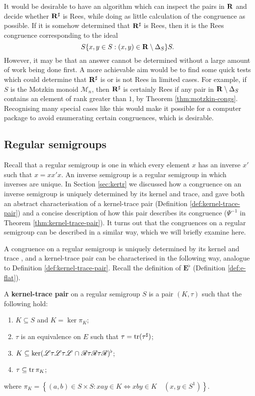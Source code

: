 It would be desirable to have an algorithm which can inspect the pairs in $\mathbf{R}$
and decide whether $\mathbf{R}^\sharp$ is Rees, while doing as little calculation of the
congruence as possible.  If it is somehow determined that $\mathbf{R}^\sharp$ is Rees, then it
is the Rees congruence corresponding to the ideal
$$S\{x,y \in S : (x,y) \in \mathbf{R} \setminus \Delta_S\}S.$$
However, it may be that an answer cannot be determined without a large amount of
work being done first.  A more achievable aim would be to find some quick tests
which could determine that $\mathbf{R}^\sharp$ is or is not Rees in limited cases.  For
example, if $S$ is the Motzkin monoid $\mathcal{M}_n$, then $\mathbf{R}^\sharp$ is certainly
Rees if any pair in $\mathbf{R} \setminus \Delta_S$ contains an element of rank greater
than $1$, by Theorem \ref{thm:motzkin-congs}.  Recognising many special cases
like this would make it possible for a computer package to avoid enumerating
certain congruences, which is desirable.

\subsection{Regular semigroups}
\label{sec:converting-regular}
Recall that a regular semigroup  is one in which every element $x$ has an inverse
$x'$ such that $x = xx'x$.  An inverse semigroup is a regular semigroup in which
inverses are unique.  In Section \ref{sec:kertr} we discussed how a congruence
on an inverse semigroup is uniquely determined by its kernel and trace, and gave
both an abstract characterisation of a kernel-trace pair (Definition
\ref{def:kernel-trace-pair}) and a concise description of how this pair
describes its congruence ($\Psi^{-1}$ in Theorem \ref{thm:kernel-trace-pair}).
It turns out that the congruences on a regular semigroup can be described in a
similar way, which we will briefly examine here.

A congruence on a regular semigroup is uniquely determined by its kernel and
trace \cite[Corollary 2.11]{pastijn_1986}, and a kernel-trace pair can be
characterised in the following way, analogue to Definition
\ref{def:kernel-trace-pair}.  Recall the definition of $\mathbf{E}^\flat$
(Definition \ref{def:e-flat}).

\begin{definition}
  \label{def:regular-kernel-trace-pair}
  A \textbf{kernel-trace pair} on a regular semigroup $S$ is a pair $(K,\tau)$
  such that the following hold:
  \begin{enumerate}[\rm(1)]
  \item $K \subseteq S$ and $K = \ker \pi_K$;
  \item $\tau$ is an equivalence on $E$ such that $\tau = \operatorname{tr}(\tau^\sharp)$;
  \item
    $K \subseteq \ker(\mathrel{\mathscr{L}}\mathrel{\tau}\mathrel{\mathscr{L}}\mathrel{\tau}\mathrel{\mathscr{L}} \cap
    \mathrel{\mathscr{R}}\mathrel{\tau}\mathrel{\mathscr{R}}\mathrel{\tau}\mathrel{\mathscr{R}})^\flat$;
  \item $\tau \subseteq \operatorname{tr} \pi_K$;
  \end{enumerate}
  where
  $\pi_K = \left\{(a,b) \in S \times S : xay \in K \Leftrightarrow xby \in K
    \quad (x,y \in S^1)\right\}$.
\end{definition}


